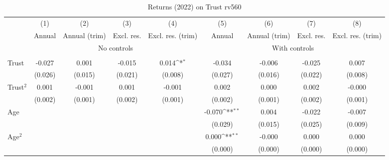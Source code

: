 \begin{table}[htbp]\centering
\def\sym#1{\ifmmode^{#1}\else\(^{#1}\)\fi}
\caption{Returns (2022) on Trust rv560}
\begin{tabular}{l*{8}{c}}
\toprule
          &\multicolumn{1}{c}{(1)}&\multicolumn{1}{c}{(2)}&\multicolumn{1}{c}{(3)}&\multicolumn{1}{c}{(4)}&\multicolumn{1}{c}{(5)}&\multicolumn{1}{c}{(6)}&\multicolumn{1}{c}{(7)}&\multicolumn{1}{c}{(8)}\\
          &\multicolumn{1}{c}{Annual}&\multicolumn{1}{c}{Annual (trim)}&\multicolumn{1}{c}{Excl. res.}&\multicolumn{1}{c}{Excl. res. (trim)}&\multicolumn{1}{c}{Annual}&\multicolumn{1}{c}{Annual (trim)}&\multicolumn{1}{c}{Excl. res.}&\multicolumn{1}{c}{Excl. res. (trim)}\\
& \multicolumn{4}{c}{No controls} & \multicolumn{4}{c}{With controls} \\\\ \cmidrule(lr){2-5}\cmidrule(lr){6-9}
Trust     &   -0.027         &    0.001         &   -0.015         &    0.014\sym{*}  &   -0.034         &   -0.006         &   -0.025         &    0.007         \\
          &  (0.026)         &  (0.015)         &  (0.021)         &  (0.008)         &  (0.027)         &  (0.016)         &  (0.022)         &  (0.008)         \\
Trust$^{2}$&    0.001         &   -0.001         &    0.001         &   -0.001         &    0.002         &    0.000         &    0.002         &   -0.000         \\
          &  (0.002)         &  (0.001)         &  (0.002)         &  (0.001)         &  (0.002)         &  (0.001)         &  (0.002)         &  (0.001)         \\
Age       &                  &                  &                  &                  &   -0.070\sym{**} &    0.004         &   -0.022         &   -0.007         \\
          &                  &                  &                  &                  &  (0.029)         &  (0.015)         &  (0.025)         &  (0.009)         \\
Age$^{2}$ &                  &                  &                  &                  &    0.000\sym{**} &   -0.000         &    0.000         &    0.000         \\
          &                  &                  &                  &                  &  (0.000)         &  (0.000)         &  (0.000)         &  (0.000)         \\

\end{tabular}
\end{table}
